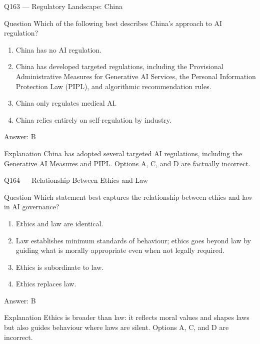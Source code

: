 \documentclass[aspectratio=169,8pt]{beamer}
\begin{document}
\begin{frame}{Q163 --- Regulatory Landscape: China}
\begin{block}{Question}
Which of the following best describes China's approach to AI regulation?
\begin{enumerate}
\item China has no AI regulation.
\item China has developed targeted regulations, including the Provisional Administrative Measures for Generative AI Services, the Personal Information Protection Law (PIPL), and algorithmic recommendation rules.
\item China only regulates medical AI.
\item China relies entirely on self-regulation by industry.
\end{enumerate}  \end{block}
\begin{exampleblock}{Answer: B}\end{exampleblock}
\begin{block}{Explanation}
China has adopted several targeted AI regulations, including the Generative AI Measures and PIPL. Options A, C, and D are factually incorrect.
\end{block}
\end{frame}

\begin{frame}{Q164 --- Relationship Between Ethics and Law}
\begin{block}{Question}
Which statement best captures the relationship between ethics and law in AI governance?
\begin{enumerate}
\item Ethics and law are identical.
\item Law establishes minimum standards of behaviour; ethics goes beyond law by guiding what is morally appropriate even when not legally required.
\item Ethics is subordinate to law.
\item Ethics replaces law.
\end{enumerate}  \end{block}
\begin{exampleblock}{Answer: B}\end{exampleblock}
\begin{block}{Explanation}
Ethics is broader than law: it reflects moral values and shapes laws but also guides behaviour where laws are silent. Options A, C, and D are incorrect.
\end{block}
\end{frame}
\end{document}
